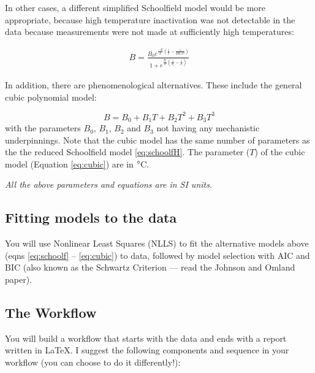 In other cases, a different simplified Schoolfield model would be more 
appropriate, because high temperature inactivation was not detectable 
in the data because measurements were not made at sufficiently high 
temperatures:

\begin{equation} \label{eq:schoolfLo}
	\begin{aligned}
	  B = \frac{B_0 e^{\frac{-E}{k} (\frac{1}{T} - \frac{1}{283.15})}}
    { 1 +  e^{\frac{E_l}{k} (\frac{1}{T_l} - \frac{1}{T})}}
	\end{aligned}
\end{equation}

In addition, there are phenomenological alternatives. These include the 
general cubic polynomial model:

\begin{equation}\label{eq:cubic}
	B = B_0 + B_1 T + B_2 T^2 + B_3 T^3
\end{equation}
with the parameters $B_0$, $B_1$, $B_2$ and $B_3$ not having any 
mechanistic underpinnings. Note that the cubic model has the same 
number of parameters as the the reduced Schoolfield model 
\ref{eq:schoolfH}. The parameter ($T$) of the cubic model (Equation 
\ref{eq:cubic}) are in $\degree$C.

{\it All the above parameters and equations are in SI units}.

\subsection {Fitting models to the data}

You will use Nonlinear Least Squares (NLLS) to fit the alternative 
models above (eqns \ref{eq:schoolf} -- \ref{eq:cubic}) to data, 
followed by model selection with AIC and BIC (also known as the 
Schwartz Criterion --- read the Johnson and Omland paper).
 
\subsection {The Workflow}

You will build a workflow that starts with the data and ends with a 
report written in \LaTeX. I suggest the following components and 
sequence in your workflow (you can choose to do it differently!):

